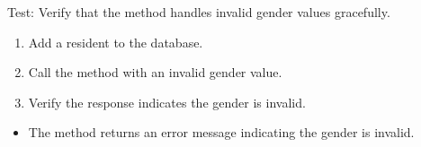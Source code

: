 \documentclass[letterpaper,10pt,english]{sphinxmanual}
\begin{document}
\begin{fulllineitems}
\label{\detokenize{test:test.test_residetnt.test_update_resident_gender_invalid_gender}}
\pysigstartsignatures
\pysiglinewithargsret
{}
{}
{}
\pysigstopsignatures
\sphinxAtStartPar
Test: Verify that the method handles invalid gender values gracefully.
\begin{description}
\begin{enumerate}
%
\item {} 
\sphinxAtStartPar
Add a resident to the database.

\item {} 
\sphinxAtStartPar
Call the  method with an invalid gender value.

\item {} 
\sphinxAtStartPar
Verify the response indicates the gender is invalid.

\end{enumerate}

\begin{itemize}
\item {} 
\sphinxAtStartPar
The method returns an error message indicating the gender is invalid.

\end{itemize}

\end{description}

\end{fulllineitems}

\end{document}
